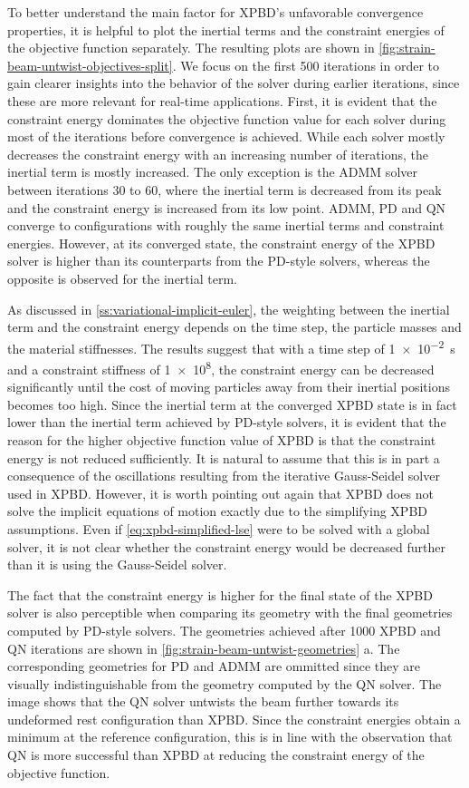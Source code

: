 To better understand the main factor for XPBD's unfavorable convergence properties, it is helpful to plot the inertial terms and the constraint energies of the objective 
function separately. The resulting plots are shown in \autoref{fig:strain-beam-untwist-objectives-split}. 
We focus on the first 500 iterations in order to gain clearer insights into the behavior of the solver during earlier iterations, since these are more relevant for 
real-time applications. First, it is evident that the constraint energy dominates the objective function value for each solver during most of the iterations before 
convergence is achieved. While each solver mostly decreases the constraint energy with an increasing number of iterations, the inertial term is mostly increased. 
The only exception is the ADMM solver between iterations 30 to 60, where the inertial term is decreased from its peak and the constraint energy is increased from its 
low point. ADMM, PD and QN converge to configurations with roughly the same inertial terms and constraint energies. However, at its converged state, the constraint 
energy of the XPBD solver is higher than its counterparts from the PD-style solvers, whereas the opposite is observed for the inertial term. 

As discussed in \autoref{ss:variational-implicit-euler}, the weighting between the inertial term and the constraint energy depends on the time step, the particle masses 
and the material stiffnesses. The results suggest that with a time step of \SI{1e-2}{\second} and a constraint stiffness of \num{1e8}, the constraint energy can be 
decreased significantly until the cost of moving particles away from their inertial positions becomes too high. Since the inertial term at the converged XPBD state 
is in fact lower than the inertial term achieved by PD-style solvers, it is evident that the reason for the 
higher objective function value of XPBD is that the constraint energy is not reduced sufficiently. It is natural to assume that this 
is in part a consequence of the oscillations resulting from the iterative Gauss-Seidel solver used in XPBD. However, it is worth pointing out again that XPBD does not 
solve the implicit equations of motion exactly due to the simplifying XPBD assumptions. Even if \autoref{eq:xpbd-simplified-lse} were to be solved with a global solver,
it is not clear whether the constraint energy would be decreased further than it is using the Gauss-Seidel solver. 

The fact that the constraint energy is higher for the final state of the XPBD solver is also perceptible when comparing its geometry with the final geometries computed 
by PD-style solvers. The geometries achieved after 1000 XPBD and QN iterations are shown in \autoref{fig:strain-beam-untwist-geometries} a. 
The corresponding geometries for PD and ADMM are ommitted since they are visually indistinguishable from the geometry computed by the QN solver. The image shows 
that the QN solver untwists the beam further towards its undeformed rest configuration than XPBD. Since the constraint energies obtain a minimum at the reference 
configuration, this is in line with the observation that QN is more successful than XPBD at reducing the constraint energy of the objective function.

